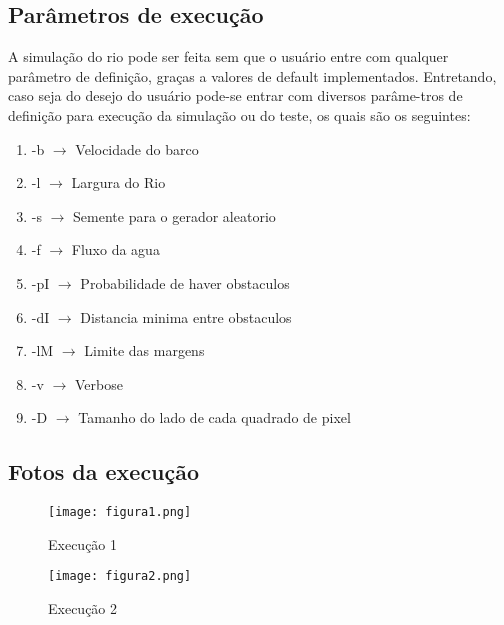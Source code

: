 \documentclass[a4paper,11pt]{article}
\begin{document}
\subsection{Parâmetros de execu\c{c}ão}
A simula\c{c}ão do rio pode ser feita sem que o usuário entre com qualquer parâmetro de defini\c{c}ão, gra\c{c}as a valores de default implementados. Entretando, caso seja do desejo do usuário pode-se entrar com diversos parâme-tros de defini\c{c}ão para execu\c{c}ão da simula\c{c}ão ou do teste, os quais são os seguintes:
\begin{enumerate}
\item[]{-b  $\rightarrow$ Velocidade do barco}
\item[]{-l  $\rightarrow$ Largura do Rio}
\item[]{-s  $\rightarrow$ Semente para o gerador aleatorio}
\item[]{-f  $\rightarrow$ Fluxo da agua}
\item[]{-pI $\rightarrow$ Probabilidade de haver obstaculos}
\item[]{-dI $\rightarrow$ Distancia minima entre obstaculos}
\item[]{-lM $\rightarrow$ Limite das margens}
\item[]{-v  $\rightarrow$ Verbose}
\item[]{-D  $\rightarrow$ Tamanho do lado de cada quadrado de pixel}
\end{enumerate} 


\newpage
\subsection{Fotos da execu\c{c}ão}
\begin{figure}[htb]
\begin{center}
\texttt{[image: figura1.png]}
\caption{Execu\c{c}ão 1}

\end{center}
\end{figure}


\begin{figure}[htb]
\begin{center}
\texttt{[image: figura2.png]}
\caption{Execu\c{c}ão 2}
\end{center}
\end{figure}
\end{document}
